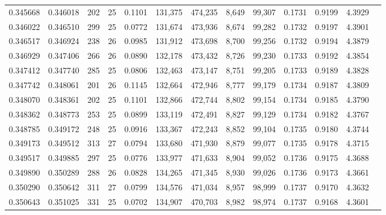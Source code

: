\begin{tabular}{rrrrrrrrrrrrr}
0.345668 & 0.346018 & 202 &  25 &                                     0.1101 & 131,375 & 474,235 &   8,649 &  99,307 & 0.1731 & 0.9199 & 4.3929 \\
0.346022 & 0.346510 & 299 &  25 &                                     0.0772 & 131,674 & 473,936 &   8,674 &  99,282 & 0.1732 & 0.9197 & 4.3901 \\
0.346517 & 0.346924 & 238 &  26 &                                     0.0985 & 131,912 & 473,698 &   8,700 &  99,256 & 0.1732 & 0.9194 & 4.3879 \\
0.346929 & 0.347406 & 266 &  26 &                                     0.0890 & 132,178 & 473,432 &   8,726 &  99,230 & 0.1733 & 0.9192 & 4.3854 \\
0.347412 & 0.347740 & 285 &  25 &                                     0.0806 & 132,463 & 473,147 &   8,751 &  99,205 & 0.1733 & 0.9189 & 4.3828 \\
0.347742 & 0.348061 & 201 &  26 &                                     0.1145 & 132,664 & 472,946 &   8,777 &  99,179 & 0.1734 & 0.9187 & 4.3809 \\
0.348070 & 0.348361 & 202 &  25 &                                     0.1101 & 132,866 & 472,744 &   8,802 &  99,154 & 0.1734 & 0.9185 & 4.3790 \\
0.348362 & 0.348773 & 253 &  25 &                                     0.0899 & 133,119 & 472,491 &   8,827 &  99,129 & 0.1734 & 0.9182 & 4.3767 \\
0.348785 & 0.349172 & 248 &  25 &                                     0.0916 & 133,367 & 472,243 &   8,852 &  99,104 & 0.1735 & 0.9180 & 4.3744 \\
0.349173 & 0.349512 & 313 &  27 &                                     0.0794 & 133,680 & 471,930 &   8,879 &  99,077 & 0.1735 & 0.9178 & 4.3715 \\
0.349517 & 0.349885 & 297 &  25 &                                     0.0776 & 133,977 & 471,633 &   8,904 &  99,052 & 0.1736 & 0.9175 & 4.3688 \\
0.349890 & 0.350289 & 288 &  26 &                                     0.0828 & 134,265 & 471,345 &   8,930 &  99,026 & 0.1736 & 0.9173 & 4.3661 \\
0.350290 & 0.350642 & 311 &  27 &                                     0.0799 & 134,576 & 471,034 &   8,957 &  98,999 & 0.1737 & 0.9170 & 4.3632 \\
0.350643 & 0.351025 & 331 &  25 &                                     0.0702 & 134,907 & 470,703 &   8,982 &  98,974 & 0.1737 & 0.9168 & 4.3601 \\

\end{tabular}
